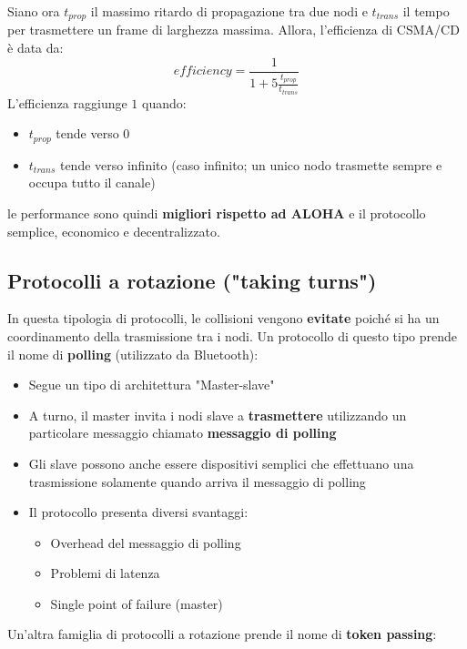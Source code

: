 \documentclass[12pt]{article}
\begin{document}
Siano ora $t_{prop}$ il massimo ritardo di propagazione tra due nodi e $t_{trans}$ il tempo per trasmettere un frame di larghezza massima.
Allora, l'efficienza di CSMA/CD è data da:
$$efficiency = \frac{1}{1 + 5 \frac{t_{prop}}{t_{trans}}}$$
L'efficienza raggiunge $1$ quando:
\begin{itemize}
    \item $t_{prop}$ tende verso 0
    \item $t_{trans}$ tende verso infinito (caso infinito; un unico nodo trasmette sempre e occupa tutto il canale)
\end{itemize}
le performance sono quindi \textbf{migliori rispetto ad ALOHA} e il protocollo semplice, economico e decentralizzato.
\subsection{Protocolli a rotazione ("taking turns")}
In questa tipologia di protocolli, le collisioni vengono \textbf{evitate} poiché si ha un coordinamento della trasmissione tra i nodi.
Un protocollo di questo tipo prende il nome di \textbf{polling} (utilizzato da Bluetooth):
\begin{itemize}
    \item Segue un tipo di architettura "Master-slave"
    \item A turno, il master invita i nodi slave a \textbf{trasmettere} utilizzando un particolare messaggio chiamato \textbf{messaggio di polling}
    \item Gli slave possono anche essere dispositivi semplici che effettuano una trasmissione solamente quando arriva il messaggio di polling
    \item Il protocollo presenta diversi svantaggi:
    \begin{itemize}
        \item Overhead del messaggio di polling
        \item Problemi di latenza
        \item Single point of failure (master)
    \end{itemize}
\end{itemize}
Un'altra famiglia di protocolli a rotazione prende il nome di \textbf{token passing}:
\end{document}
